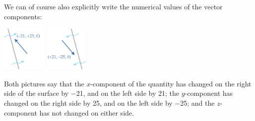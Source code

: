 \documentclass[a4paper,12pt,%
onecolumn,oneside,%
british%
]{memoir}
\providecommand{\href}[2]{#2}
\renewcommand*{\|}[1][]{\nonscript\:#1\vert\nonscript\:\mathopen{}}
\newcommand*{\furl}[2]{\href{#1}{#2}\pagenote{\url{#1}}}
\begin{document}

\medskip

We can of course also explicitly write the numerical values of the vector components:\noprelistbreak
\begin{center}\label{fig:vector_fluxes_components}
  \bigskip
  \hspace*{\fill}
  \includegraphics[align=c,height=6em]{images/flux_vec_right_num.pdf}
\qquad
\includegraphics[align=c,height=6em]{images/flux_vec_left_num.pdf}
\hspace*{\fill}
\end{center}
Both pictures say that the $x$-component of the quantity has changed on the right side of the surface by \num{-21}, and on the left side by \num{+21}; the $y$-component  has changed on the right side by \num{+25}, and on the left side by \num{-25}; and the $z$-component has not changed on either side.

\medskip
\end{document}
